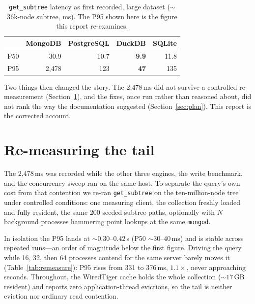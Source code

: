 \documentclass[11pt]{article}
\newcommand{\code}[1]{\texttt{#1}}
\newcommand{\best}[1]{\textbf{#1}}
\newcommand{\hdr}{\rowcolor{hdrgray}}
\newcommand{\key}{\rowcolor{keyrow}}
\newenvironment{ctab}{\par\medskip\centering\small
  \setlength{\tabcolsep}{5pt}\renewcommand{\arraystretch}{1.12}}{\par\medskip}
\begin{document}
\begin{table}[h]
\caption{\code{get\_subtree} latency as first recorded, large dataset
(${\sim}$36k-node subtree, ms). The P95 shown here is the figure this report
re-examines.}
\label{tab:gap}
\begin{ctab}
\begin{tabular}{@{}lrrrr@{}}
\toprule
\hdr & MongoDB & PostgreSQL & DuckDB & SQLite \\
\midrule
P50 & 30.9  & 10.7 & \best{9.9} & 11.8 \\
\key P95 & 2{,}478 & 123  & \best{47} & 135 \\
\bottomrule
\end{tabular}
\end{ctab}
\end{table}

Two things then changed the story. The 2{,}478\,ms did not survive a controlled
re-measurement (Section~\ref{sec:remeasure}), and the fixes, once run rather than
reasoned about, did not rank the way the documentation suggested
(Section~\ref{sec:plan}). This report is the corrected account.

\section{Re-measuring the tail}\label{sec:remeasure}

The 2{,}478\,ms was recorded while the other three engines, the write benchmark,
and the concurrency sweep ran on the same host. To separate the query's own cost
from that contention we re-ran \code{get\_subtree} on the ten-million-node tree
under controlled conditions: one measuring client, the collection freshly loaded
and fully resident, the same 200 seeded subtree paths, optionally with $N$
background processes hammering point lookups at the same \code{mongod}.

In isolation the P95 lands at ${\sim}0.30$--$0.42$\,s (P50 ${\sim}30$--$40$\,ms)
and is stable across repeated runs---an order of magnitude below the first
figure. Driving the query while 16, 32, then 64 processes contend for the same
server barely moves it (Table~\ref{tab:remeasure}): P95 rises from 331 to
376\,ms, $1.1\times$, never approaching seconds. Throughout, the WiredTiger cache
holds the whole collection (${\sim}17$\,GB resident) and reports zero
application-thread evictions, so the tail is neither eviction nor ordinary read
contention.
\end{document}
